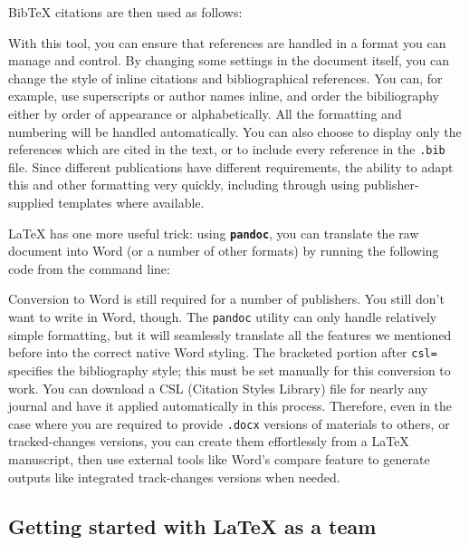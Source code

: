 
\noindent BibTeX citations are then used as follows:


With this tool, you can ensure that references are handled
in a format you can manage and control.\cite{flom2005latex}
By changing some settings in the document itself,
you can change the style of inline citations and bibliographical references.
You can, for example, use superscripts or author names inline,
and order the bibiliography either by order of appearance or alphabetically.
All the formatting and numbering will be handled automatically.
You can also choose to display only the references which are cited in the text,
or to include every reference in the \texttt{.bib} file.
Since different publications have different requirements,
the ability to adapt this and other formatting very quickly,
including through using publisher-supplied templates where available.

{\LaTeX} has one more useful trick:
using \textbf{\texttt{pandoc}},
you can translate the raw document into Word
(or a number of other formats)
by running the following code from the command line:


\noindent Conversion to Word is still required for a number of publishers.
You still don't want to write in Word, though.
The \texttt{pandoc} utility can only handle relatively simple formatting,
but it will seamlessly translate all the features we mentioned before
into the correct native Word styling.
The bracketed portion after \texttt{csl=} specifies the bibliography style;
this must be set manually for this conversion to work.
You can download a CSL (Citation Styles Library) file
for nearly any journal and have it applied automatically in this process.
Therefore, even in the case where you are required to provide
\texttt{.docx} versions of materials to others, or tracked-changes versions,
you can create them effortlessly from a {\LaTeX} manuscript,
then use external tools like Word's compare feature
to generate outputs like integrated track-changes versions when needed.


\subsection{Getting started with {\LaTeX} as a team}

